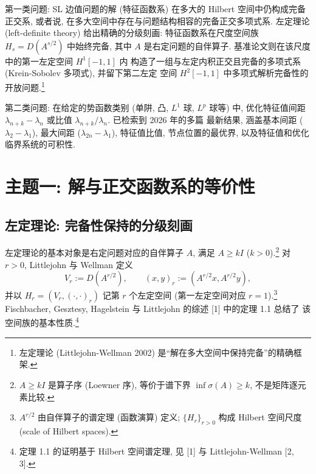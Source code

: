 \documentclass[UTF8]{ctexart}
\begin{document}
第一类问题: SL 边值问题的解 (特征函数系) 在多大的 Hilbert 空间中仍构成完备正交系,
或者说, 在多大空间中存在与问题结构相容的完备正交多项式系. 左定理论 (left-definite
theory) 给出精确的分级刻画: 特征函数系在尺度空间族 $H_s = D(A^{s/2})$ 中始终完备,
其中 $A$ 是右定问题的自伴算子. 基准论文则在该尺度中的第一左定空间 $H^1[-1,1]$ 内
构造了一组与左定内积正交且完备的多项式系 (Krein-Sobolev 多项式), 并留下第二左定
空间 $H^2[-1,1]$ 中多项式解析完备性的开放问题.\footnote{左定理论 (Littlejohn-Wellman 2002) 是``解在多大空间中保持完备''的精确框架.}

第二类问题: 在给定的势函数类别 (单阱, 凸, $L^1$ 球, $L^p$ 球等) 中, 优化特征值间距
$\lambda_{n+k} - \lambda_n$ 或比值 $\lambda_{n+k}/\lambda_n$. 已检索到 2026 年的多篇
最新结果, 涵盖基本间距 ($\lambda_2 - \lambda_1$), 最大间距 ($\lambda_{2n} - \lambda_1$),
特征值比值, 节点位置的最优界, 以及特征值和优化临界系统的可积性.

\section{主题一: 解与正交函数系的等价性}

\subsection{左定理论: 完备性保持的分级刻画}

左定理论的基本对象是右定问题对应的自伴算子 $A$, 满足 $A \geq kI$ ($k > 0$).\footnote{$A \geq kI$ 是算子序 (Loewner 序), 等价于谱下界 $\inf\sigma(A) \geq k$, 不是矩阵逐元素比较.}
对 $r > 0$, Littlejohn 与 Wellman 定义
\begin{equation}
	V_r := D(A^{r/2}), \qquad (x, y)_r := (A^{r/2}x, A^{r/2}y),
\end{equation}
并以 $H_r = (V_r, (\cdot, \cdot)_r)$ 记第 $r$ 个左定空间 (第一左定空间对应 $r = 1$).\footnote{$A^{r/2}$ 由自伴算子的谱定理 (函数演算) 定义; $\{H_r\}_{r>0}$ 构成 Hilbert 空间尺度 (scale of Hilbert spaces).}
Fischbacher, Gesztesy, Hagelstein 与 Littlejohn 的综述 [1] 中的定理 1.1 总结了
该空间族的基本性质.\footnote{定理 1.1 的证明基于 Hilbert 空间谱定理, 见 [1] 与 Littlejohn-Wellman [2, 3].}
\end{document}
